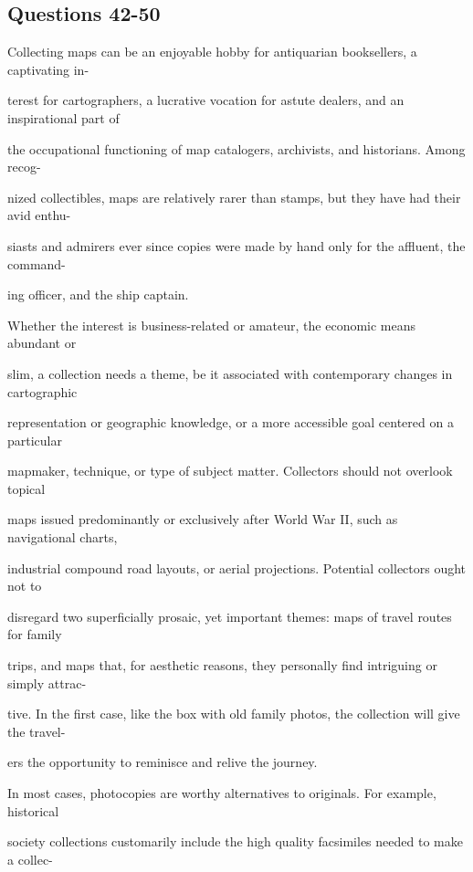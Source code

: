 \documentclass[12pt]{article}
\begin{document}
\subsection*{Questions 42-50}
\begingroup
\small
\sloppy
\setlength{\parskip}{0pt}
\setlength{\parindent}{0pt}
Collecting maps can be an enjoyable hobby for antiquarian booksellers, a captivating in-\par
terest for cartographers, a lucrative vocation for astute dealers, and an inspirational part of\par
the occupational functioning of map catalogers, archivists, and historians. Among recog-\par
nized collectibles, maps are relatively rarer than stamps, but they have had their avid enthu-\par
siasts and admirers ever since copies were made by hand only for the affluent, the command-\par
ing officer, and the ship captain.\par
Whether the interest is business-related or amateur, the economic means abundant or\par
slim, a collection needs a theme, be it associated with contemporary changes in cartographic\par
representation or geographic knowledge, or a more accessible goal centered on a particular\par
mapmaker, technique, or type of subject matter. Collectors should not overlook topical\par
maps issued predominantly or exclusively after World War II, such as navigational charts,\par
industrial compound road layouts, or aerial projections. Potential collectors ought not to\par
disregard two superficially prosaic, yet important themes: maps of travel routes for family\par
trips, and maps that, for aesthetic reasons, they personally find intriguing or simply attrac-\par
tive. In the first case, like the box with old family photos, the collection will give the travel-\par
ers the opportunity to reminisce and relive the journey.\par
In most cases, photocopies are worthy alternatives to originals. For example, historical\par
society collections customarily include the high quality facsimiles needed to make a collec-\par
\end{document}
